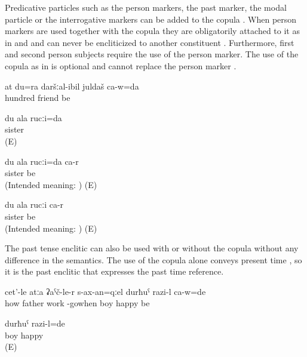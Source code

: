 Predicative particles such as the person markers, the past marker, the modal particle or the interrogative markers can be added to the copula . When person markers are used together with the copula they are obligatorily attached to it as in  and  and can never be encliticized to another constituent . Furthermore, first and second person subjects require the use of the person marker. The use of the copula as in  is optional and cannot replace the person marker .
%
\begin{exe}
	\ex	\label{ex:‎‎I am your 100th friend}
	\gll	at	du=ra	daršːal-ibil	juldaš	ca-w=da\\
				hundred	friend	be\\
	\glt	{}

	\ex	\label{ex:ungrammaticalIamyoursisterA_1}
	\gll	du ala rucːi=da \\
				sister	\\
	\glt	{} (E)
	
	\ex	\label{ex:ungrammaticalIamyoursisterA}
	\gll	*du ala rucːi=da ca-r\\
		\hphantom{*}		sister	be\\
	\glt	(Intended meaning: ) (E)

	\ex	\label{ex:ungrammaticalIamyoursisterB}
	\gll	*du ala rucːi ca-r\\
		\hphantom{*}		sister	be\\
	\glt	(Intended meaning: ) (E)
\end{exe}

The past tense enclitic can also be used with  or without the copula  without any difference in the semantics. The use of the copula alone conveys present time , so it is the past enclitic that expresses the past time reference. 
%
\begin{exe}
	\ex	\label{ex:‎When the father came back from work, the boy was happy}
	\gll	cet'-le	atːa	ʡaˁč-le-r	s-ax-an=qːel	durħuˁ	razi-l	ca-w=de\\
		how	father	work	-gowhen	boy	happy	be\\
	\glt	{}

	\ex	\label{ex:The boy was happy.COP}
	\gll	durħuˁ	razi-l=de\\
		boy	happy\\
	\glt	{} (E)
\end{exe}

